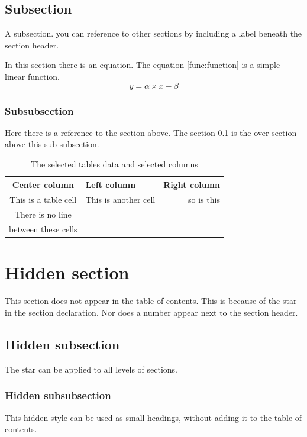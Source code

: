 \documentclass[a4paper,11pt]{article}
\begin{document}
\subsection{Subsection}
\label{sec:subsection}
A subsection. you can reference to other sections by including a label beneath the section header.

In this section there is an equation. The equation \ref{func:function} is a simple linear function.
\begin{equation}
	y = \alpha \times x -\beta
	\label{func:function}
\end{equation}
\subsubsection{Subsubsection}
Here there is a reference to the section above. The section \ref{sec:subsection} is the over section above this sub subsection.

\begin{table}[h]
\centering
	\begin{tabular}{|c|l|r}
		\hline
		Center column & Left column & Right column\\ 
		\hline
		This is a table cell & This is another cell & so is this \\
		\hline
		There is no line & & \\
		between these cells & & \\		
		\hline
	\end{tabular}
	\caption{The selected tables data and selected columns}
	\label{Tab:simTab}
\end{table}

\section*{Hidden section}
This section does not appear in the table of contents. This is because of the star in the section declaration. Nor does a number appear next to the section header.
\subsection*{Hidden subsection}
The star can be applied to all levels of sections.
\subsubsection*{Hidden subsubsection}
This hidden style can be used as small headings, without adding it to the table of contents.
\end{document}
